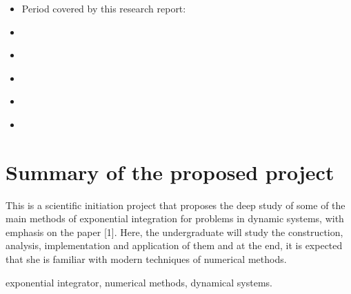 \documentclass[letterpaper,10pt,english]{jupyterBook}
\begin{document}
\sphinxAtStartPar
{}
\begin{itemize}
\item {} 
\sphinxAtStartPar
Period covered by this research report:

\end{itemize}

\sphinxAtStartPar
{}
\begin{itemize}
\item {} 
\sphinxAtStartPar
{\hyperref[\detokenize{Summary_of_the_proposed_project::doc}]{}}

\item {} 
\sphinxAtStartPar
{\hyperref[\detokenize{Project_execution::doc}]{}}

\item {} 
\sphinxAtStartPar
{\hyperref[\detokenize{References::doc}]{}}

\item {} 
\sphinxAtStartPar
{\hyperref[\detokenize{gestao_dados::doc}]{}}

\item {} 
\sphinxAtStartPar
{\hyperref[\detokenize{appendix::doc}]{}}

\end{itemize}

\sphinxstepscope


\chapter{Summary of the proposed project}
\label{\detokenize{Summary_of_the_proposed_project:summary-of-the-proposed-project}}\label{\detokenize{Summary_of_the_proposed_project::doc}}
\sphinxAtStartPar
This is a scientific initiation project that proposes the deep study of some of the main methods
of exponential integration for problems in dynamic systems, with emphasis on the paper {[}1{]}.
Here, the undergraduate will study the construction, analysis, implementation and application
of them and at the end, it is expected that she is familiar with modern techniques of numerical
methods.

\sphinxAtStartPar
{} exponential integrator, numerical methods, dynamical systems.
\end{document}

